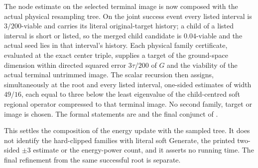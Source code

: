 \documentclass{article}
\begin{document}
The node estimate on the selected terminal image is now composed with the
actual physical resampling tree. On the joint success event every listed
interval is $3/200$-viable and carries its literal original-target history;
a child of a listed interval is short or listed, so the merged child candidate
is $0.04$-viable and the actual seed lies in that interval's history. Each
physical family certificate, evaluated at the exact center triple, supplies a
target of the ground-space dimension within directed squared error $3\tau/200$
of $G$ and the viability of the actual terminal untrimmed image. The scalar
recursion then assigns, simultaneously at the root and every listed interval,
one-sided estimates of width $49/16$, each equal to three below the least
eigenvalue of the child-centred soft regional operator compressed to that
terminal image. No second family, target or image is chosen. The formal
statements are
and the final conjunct of
.

This settles the composition of the energy update with the sampled tree. It
does not identify the hard-clipped families with literal soft Generate, the
printed two-sided $\pm3$ estimate or the energy-power count, and it asserts
no running time. The final refinement from the same successful root is
separate.
\end{document}
